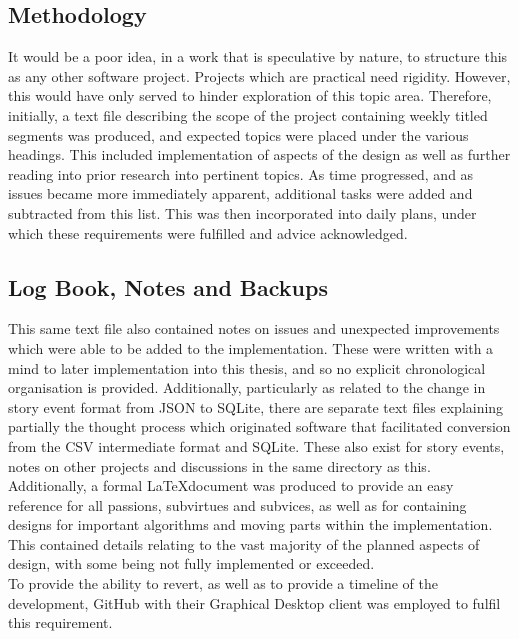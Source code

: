 \documentclass[12pt]{article}
\begin{document}
\subsection{Methodology}
It would be a poor idea, in a work that is speculative by nature, to structure this as any other software project. Projects which are practical need rigidity. However, this would have only served to hinder exploration of this topic area. Therefore, initially, a text file describing the scope of the project containing weekly titled segments was produced, and expected topics were placed under the various headings. This included implementation of aspects of the design as well as further reading into prior research into pertinent topics. As time progressed, and as issues became more immediately apparent, additional tasks were added and subtracted from this list. This was then incorporated into daily plans, under which these requirements were fulfilled and advice acknowledged. 

\subsection{Log Book, Notes and Backups} 
This same text file also contained notes on issues and unexpected improvements which were able to be added to the implementation. These were written with a mind to later implementation into this thesis, and so no explicit chronological organisation is provided. Additionally, particularly as related to the change in story event format from JSON to SQLite, there are separate text files explaining partially the thought process which originated software that facilitated conversion from the CSV intermediate format and SQLite. These also exist for story events, notes on other projects and discussions in the same directory as this. \\
Additionally, a formal \LaTeX document was produced to provide an easy reference for all passions, subvirtues and subvices, as well as for containing designs for important algorithms and moving parts within the implementation. This contained details relating to the vast majority of the planned aspects of design, with some being not fully implemented or exceeded. \\
To provide the ability to revert, as well as to provide a timeline of the development, GitHub with their Graphical Desktop client was employed to fulfil this requirement. 
\end{document}
